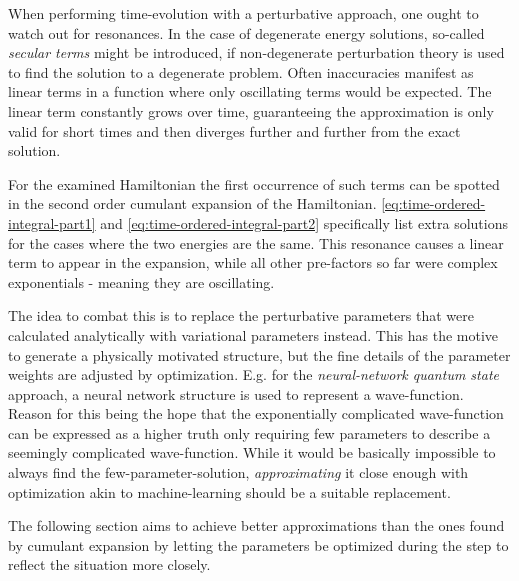 When performing time-evolution with a perturbative approach, one ought to watch out for resonances.
In the case of degenerate energy solutions, so-called \emph{secular terms} \cite{secularTermsPerturbation} might be introduced, if non-degenerate perturbation theory is used to find the solution to a degenerate problem. 
Often inaccuracies manifest as linear terms in a function where only oscillating terms would be expected.
The linear term constantly grows over time, guaranteeing the approximation is only valid for short times and then diverges further and further from the exact solution.

For the examined Hamiltonian the first occurrence of such terms can be spotted in the second order cumulant expansion of the Hamiltonian.
\autoref{eq:time-ordered-integral-part1} and \autoref{eq:time-ordered-integral-part2} specifically list extra solutions for the cases where the two energies are the same.
This resonance causes a linear term to appear in the expansion, while all other pre-factors so far were complex exponentials - meaning they are oscillating.

The idea to combat this is to replace the perturbative parameters that were calculated analytically with variational parameters instead.
This has the motive to generate a physically motivated structure, but the fine details of the parameter weights are adjusted by optimization.
E.g. for the \emph{neural-network quantum state} \cite{neuralNetworkQuantumStates} approach, a neural network structure is used to represent a wave-function.
Reason for this being the hope that the exponentially complicated wave-function can be expressed as a \glqq higher truth\grqq{} only requiring few parameters to describe a seemingly complicated wave-function.
While it would be basically impossible to always find the few-parameter-solution, \emph{approximating} it close enough with optimization akin to machine-learning should be a suitable replacement.

The following section aims to achieve better approximations than the ones found by cumulant expansion by letting the parameters be optimized during the step to reflect the situation more closely.